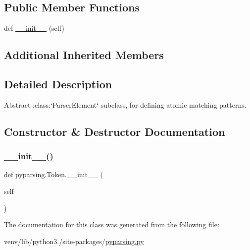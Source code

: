 \subsection*{Public Member Functions}
\begin{DoxyCompactItemize}
\item 
def \hyperlink{classpyparsing_1_1Token_a7b74e7922a384afe90034a272730bdc7}{\+\_\+\+\_\+init\+\_\+\+\_\+} (self)
\end{DoxyCompactItemize}
\subsection*{Additional Inherited Members}


\subsection{Detailed Description}
\begin{DoxyVerb}Abstract :class:`ParserElement` subclass, for defining atomic
matching patterns.
\end{DoxyVerb}
 

\subsection{Constructor \& Destructor Documentation}
\mbox{\label{classpyparsing_1_1Token_a7b74e7922a384afe90034a272730bdc7}} 
\subsubsection{\texorpdfstring{\+\_\+\+\_\+init\+\_\+\+\_\+()}{\_\_init\_\_()}}
{\footnotesize\ttfamily def pyparsing.\+Token.\+\_\+\+\_\+init\+\_\+\+\_\+ (\begin{DoxyParamCaption}\item[{}]{self }\end{DoxyParamCaption})}



The documentation for this class was generated from the following file\+:\begin{DoxyCompactItemize}
\item 
venv/lib/python3./site-\/packages/\hyperlink{pyparsing_8py}{pyparsing.\+py}\end{DoxyCompactItemize}
